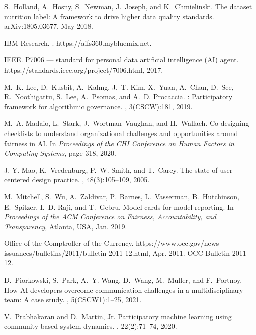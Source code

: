 \documentclass[11pt,dvipdfm]{article}
\begin{document}
\begin{thebibliography}{10}
S.~Holland, A.~Hosny, S.~Newman, J.~Joseph, and K.~Chmielinski.
\newblock The dataset nutrition label: A framework to drive higher data quality
  standards.
\newblock arXiv:1805.03677, May 2018.

{IBM Research}.
.
\newblock https://aifs360.mybluemix.net.

IEEE.
\newblock P7006 --- standard for personal data artificial intelligence ({AI})
  agent.
\newblock https://standards.ieee.org/project/7006.html, 2017.

M.~K. Lee, D.~Kusbit, A.~Kahng, J.~T. Kim, X.~Yuan, A.~Chan, D.~See,
  R.~Noothigattu, S.~Lee, A.~Psomas, and A.~D. Procaccia.
: Participatory framework for algorithmic governance.
,
  3(CSCW):181, 2019.

M.~A. Madaio, L.~Stark, J.~Wortman~Vaughan, and H.~Wallach.
\newblock Co-designing checklists to understand organizational challenges and
  opportunities around fairness in {AI}.
\newblock In {\em Proceedings of the CHI Conference on Human Factors in
  Computing Systems}, page 318, 2020.

J.-Y. Mao, K.~Vredenburg, P.~W. Smith, and T.~Carey.
\newblock The state of user-centered design practice.
, 48(3):105--109, 2005.

M.~Mitchell, S.~Wu, A.~Zaldivar, P.~Barnes, L.~Vasserman, B.~Hutchinson,
  E.~Spitzer, I.~D. Raji, and T.~Gebru.
\newblock Model cards for model reporting.
\newblock In {\em Proceedings of the ACM Conference on Fairness,
  Accountability, and Transparency}, Atlanta, USA, Jan. 2019.

{Office of the Comptroller of the Currency}.
\newblock
  https://www.occ.gov/news-issuances/bulletins/2011/bulletin-2011-12.html, Apr.
  2011.
\newblock OCC Bulletin 2011-12.

D.~Piorkowski, S.~Park, A.~Y. Wang, D.~Wang, M.~Muller, and F.~Portnoy.
\newblock How {AI} developers overcome communication challenges in a
  multidisciplinary team: A case study.
,
  5(CSCW1):1--25, 2021.

V.~Prabhakaran and D.~Martin, Jr.
\newblock Participatory machine learning using community-based system dynamics.
, 22(2):71--74, 2020.


\end{thebibliography}
\end{document}
